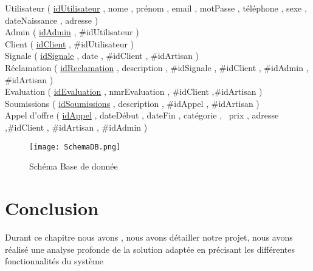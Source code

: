 \noindent Utilisateur ( \underline{idUtilisateur} , nome , prénom , email , motPasse , téléphone , sexe , dateNaissance , adresse )\\
Admin ( \underline{idAdmin} , \#idUtilisateur )\\
Client ( \underline{idClient} , \#idUtilisateur )\\
Signale ( \underline{idSignale} , date , \#idClient , \#idArtisan )\\
Réclamation ( \underline{idReclamation} , description , \#idSignale , \#idClient , \#idAdmin , \#idArtisan )\\
Evaluation ( \underline{idEvaluation} , nmrEvaluation , \#idClient ,\#idArtisan )\\
Soumissions ( \underline{idSoumissions} , description , \#idAppel , \#idArtisan )\\
Appel d’offre ( \underline{idAppel} , dateDébut , dateFin , catégorie ,  prix , adresse ,\#idClient , \#idArtisan , \#idAdmin )\\

\begin{figure}[H]
	\centering
	\texttt{[image: SchemaDB.png]}
	\caption{Schéma Base de donnée}
	\label{figure: scheme bd}
\end{figure}

\section{Conclusion}
Durant ce chapitre nous avons , nous avons détailler notre projet, nous avons réalisé une analyse profonde de la solution adaptée en précisant les différentes fonctionnalités du système 